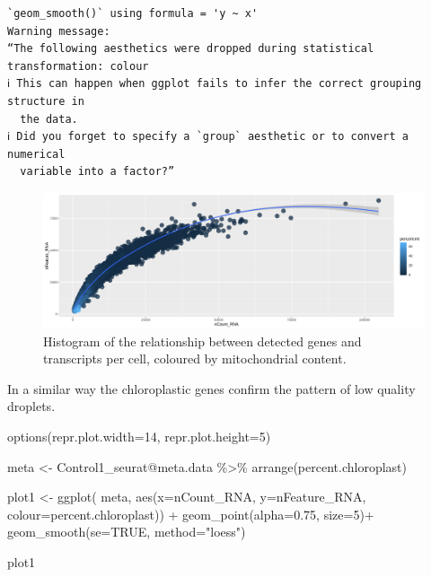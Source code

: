 \documentclass[
  letterpaper,
  DIV=11,
  numbers=noendperiod]{scrartcl}
\newenvironment{Shaded}{\begin{snugshade}}{\end{snugshade}}
\newcommand{\AttributeTok}[1]{\textcolor[rgb]{0.49,0.56,0.16}{#1}}
\newcommand{\ConstantTok}[1]{\textcolor[rgb]{0.53,0.00,0.00}{#1}}
\newcommand{\DecValTok}[1]{\textcolor[rgb]{0.25,0.63,0.44}{#1}}
\newcommand{\FloatTok}[1]{\textcolor[rgb]{0.25,0.63,0.44}{#1}}
\newcommand{\FunctionTok}[1]{\textcolor[rgb]{0.02,0.16,0.49}{#1}}
\newcommand{\NormalTok}[1]{\textcolor[rgb]{0.00,0.44,0.13}{#1}}
\newcommand{\OtherTok}[1]{\textcolor[rgb]{0.00,0.44,0.13}{#1}}
\newcommand{\SpecialCharTok}[1]{\textcolor[rgb]{0.25,0.44,0.63}{#1}}
\newcommand{\StringTok}[1]{\textcolor[rgb]{0.25,0.44,0.63}{#1}}
\begin{document}
\begin{verbatim}
`geom_smooth()` using formula = 'y ~ x'
Warning message:
“The following aesthetics were dropped during statistical transformation: colour
ℹ This can happen when ggplot fails to infer the correct grouping structure in
  the data.
ℹ Did you forget to specify a `group` aesthetic or to convert a numerical
  variable into a factor?”
\end{verbatim}

\begin{figure}[H]

{\centering \includegraphics{notebook_files/figure-pdf/fig-gentra-output-2.png}

}

\caption{\label{fig-gentra}Histogram of the relationship between
detected genes and transcripts per cell, coloured by mitochondrial
content.}

\end{figure}

In a similar way the chloroplastic genes confirm the pattern of low
quality droplets.

\begin{Shaded}
\begin{Highlighting}[]
\FunctionTok{options}\NormalTok{(}\AttributeTok{repr.plot.width=}\DecValTok{14}\NormalTok{, }\AttributeTok{repr.plot.height=}\DecValTok{5}\NormalTok{)}

\NormalTok{meta }\OtherTok{\textless{}{-}}\NormalTok{ Control1\_seurat}\SpecialCharTok{@}\NormalTok{meta.data }\SpecialCharTok{\%\textgreater{}\%} \FunctionTok{arrange}\NormalTok{(percent.chloroplast)}

\NormalTok{plot1 }\OtherTok{\textless{}{-}} \FunctionTok{ggplot}\NormalTok{( meta, }\FunctionTok{aes}\NormalTok{(}\AttributeTok{x=}\NormalTok{nCount\_RNA, }\AttributeTok{y=}\NormalTok{nFeature\_RNA, }\AttributeTok{colour=}\NormalTok{percent.chloroplast)) }\SpecialCharTok{+} 
         \FunctionTok{geom\_point}\NormalTok{(}\AttributeTok{alpha=}\FloatTok{0.75}\NormalTok{, }\AttributeTok{size=}\DecValTok{5}\NormalTok{)}\SpecialCharTok{+}
         \FunctionTok{geom\_smooth}\NormalTok{(}\AttributeTok{se=}\ConstantTok{TRUE}\NormalTok{, }\AttributeTok{method=}\StringTok{"loess"}\NormalTok{)}

\NormalTok{plot1}
\end{Highlighting}
\end{Shaded}
\end{document}

